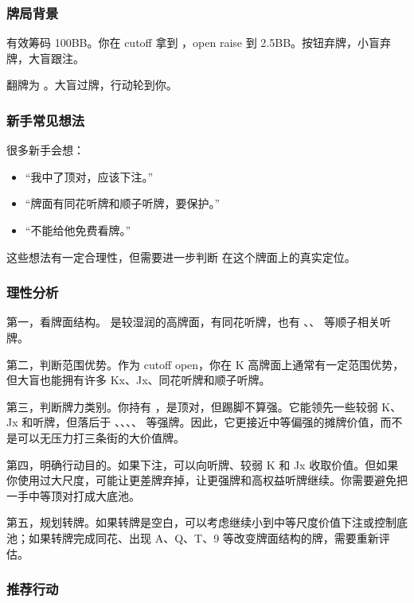 \subsubsection*{牌局背景}

有效筹码 100BB。你在 cutoff 拿到 ，open raise 到 2.5BB。按钮弃牌，小盲弃牌，大盲跟注。

翻牌为 。大盲过牌，行动轮到你。

\subsubsection*{新手常见想法}

很多新手会想：

\begin{itemize}
\item “我中了顶对，应该下注。”
\item “牌面有同花听牌和顺子听牌，要保护。”
\item “不能给他免费看牌。”
\end{itemize}

这些想法有一定合理性，但需要进一步判断  在这个牌面上的真实定位。

\subsubsection*{理性分析}

第一，看牌面结构。 是较湿润的高牌面，有同花听牌，也有 、、 等顺子相关听牌。

第二，判断范围优势。作为 cutoff open，你在 K 高牌面上通常有一定范围优势，但大盲也能拥有许多 Kx、Jx、同花听牌和顺子听牌。

第三，判断牌力类别。你持有 ，是顶对，但踢脚不算强。它能领先一些较弱 K、Jx 和听牌，但落后于 、、、、 等强牌。因此，它更接近中等偏强的摊牌价值，而不是可以无压力打三条街的大价值牌。

第四，明确行动目的。如果下注，可以向听牌、较弱 K 和 Jx 收取价值。但如果你使用过大尺度，可能让更差牌弃掉，让更强牌和高权益听牌继续。你需要避免把一手中等顶对打成大底池。

第五，规划转牌。如果转牌是空白，可以考虑继续小到中等尺度价值下注或控制底池；如果转牌完成同花、出现 A、Q、T、9 等改变牌面结构的牌，需要重新评估。

\subsubsection*{推荐行动}

